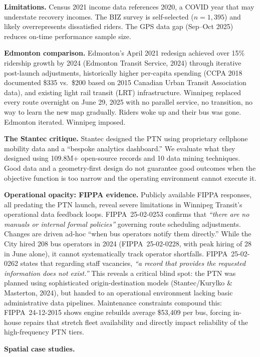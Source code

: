 \documentclass[11pt]{article}
\begin{document}
\textbf{Limitations.} Census 2021 income data references 2020, a COVID year that may understate recovery incomes. The BIZ survey is self-selected ($n=1{,}395$) and likely overrepresents dissatisfied riders. The GPS data gap (Sep--Oct 2025) reduces on-time performance sample size.

\textbf{Edmonton comparison.}
Edmonton's April 2021 redesign achieved over 15\% ridership growth by 2024 (Edmonton Transit Service, 2024) through iterative post-launch adjustments, historically higher per-capita spending (CCPA 2018 documented \$335 vs.\ \$200 based on 2015 Canadian Urban Transit Association data), and existing light rail transit (LRT) infrastructure. Winnipeg replaced every route overnight on June 29, 2025 with no parallel service, no transition, no way to learn the new map gradually. Riders woke up and their bus was gone. Edmonton iterated. Winnipeg imposed.

\textbf{The Stantec critique.} Stantec designed the PTN using proprietary cellphone mobility data and a ``bespoke analytics dashboard.'' We evaluate what they designed using 109.8M+ open-source records and 10 data mining techniques. Good data and a geometry-first design do not guarantee good outcomes when the objective function is too narrow and the operating environment cannot execute it.

\textbf{Operational opacity: FIPPA evidence.} Publicly available FIPPA responses, all predating the PTN launch, reveal severe limitations in Winnipeg Transit's operational data feedback loops. FIPPA~25-02-0253 confirms that \emph{``there are no manuals or internal formal policies''} governing route scheduling adjustments. Changes are driven ad-hoc ``when bus operators notify them directly.'' While the City hired 208 bus operators in 2024 (FIPPA~25-02-0228, with peak hiring of 28 in June alone), it cannot systematically track operator shortfalls. FIPPA~25-02-0262 states that regarding staff vacancies, \emph{``a record that provides the requested information does not exist.''} This reveals a critical blind spot: the PTN was planned using sophisticated origin-destination models (Stantec/Kurylko \& Masterton, 2024), but handed to an operational environment lacking basic administrative data pipelines. Maintenance constraints compound this: FIPPA~24-12-2015 shows engine rebuilds average \$53,409 per bus, forcing in-house repairs that stretch fleet availability and directly impact reliability of the high-frequency PTN tiers.

\textbf{Spatial case studies.}
\end{document}
